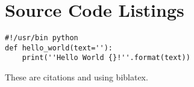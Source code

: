 \documentclass{article}
\begin{document}
\section{Source Code Listings}
\begin{lstlisting}
#!/usr/bin python
def hello_world(text=''):
    print(''Hello World {}!''.format(text))
\end{lstlisting}



These are citations \autocite[2]{PhysRevB.78.104104} and \textcite[1]{PhysRevLett.99.077601} using biblatex.
\newpage

\printbibliography
\end{document}
